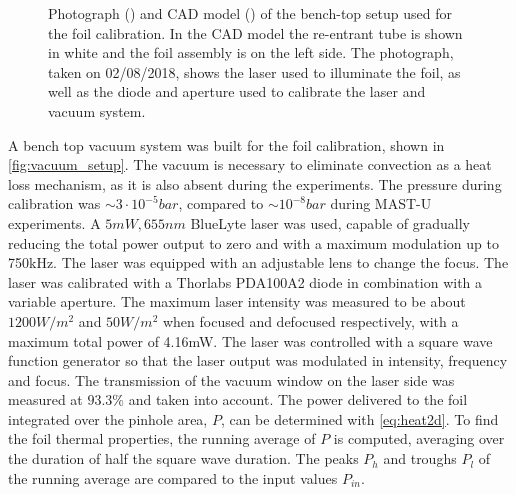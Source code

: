 \begin{figure}[!ht]
\begin{subfigure}{0.8\linewidth}
        \vspace*{-5mm}
        {\color{white}\caption{\phantom{ }}\label{fig:vacuum_setup2}}
     \end{subfigure}
        \vspace*{+5mm}
        \caption{Photograph () and CAD model () of the bench-top setup used for the foil calibration. In the CAD model the re-entrant tube is shown in white and the foil assembly is on the left side. The photograph, taken on 02/08/2018, shows the laser used to illuminate the foil, as well as the diode and aperture used to calibrate the laser and vacuum system.}
        \label{fig:vacuum_setup}
\end{figure}


A bench top vacuum system was built for the foil calibration, shown in \autoref{fig:vacuum_setup}. The vacuum is necessary to eliminate convection as a heat loss mechanism, as it is also absent during the experiments. The pressure during calibration was $\sim 3 \cdot 10^{-5}bar$, compared to $\sim 10^{-8}bar$ during MAST-U experiments.
A $5mW, 655nm$ BlueLyte laser was used, capable of gradually reducing the total power output to zero and with a maximum modulation up to 750kHz. The laser was equipped with an adjustable lens to change the focus. The laser was calibrated with a Thorlabs PDA100A2 diode in combination with a variable aperture. The maximum laser intensity was measured to be about $1200W/m^2$ and $50W/m^2$ when focused and defocused respectively, with a maximum total power of 4.16mW. The laser was controlled with a square wave function generator so that the laser output was modulated in intensity, frequency and focus. The transmission of the vacuum window on the laser side was measured at $93.3\%$ and taken into account. The power delivered to the foil integrated over the pinhole area, $P$, can be determined with \autoref{eq:heat2d}. To find the foil thermal properties, the running average of $P$ is computed, averaging over the duration of half the square wave duration. The peaks $P_h$ and troughs $P_l$ of the running average are compared to the input values $P_{in}$.

